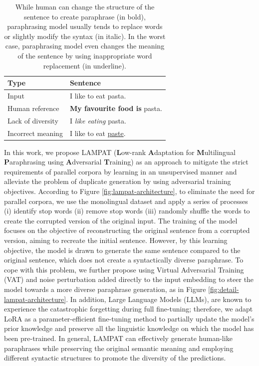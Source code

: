 \documentclass[letterpaper]{article} %
\begin{document}
\begin{table}[ht]
    \centering
    {\fontsize{9pt}{9pt}\selectfont
    \begin{tabular}{l|l}
        \textbf{Type} & \textbf{Sentence} \\ \hline
        Input &  I like to eat pasta. \\
        Human reference & \textbf{My favourite food is} pasta. \\
        Lack of diversity & I \textit{like eating} pasta. \\
        Incorrect meaning & I like to eat \underline{paste}. \\
    \end{tabular}}
    \caption{While human can change the structure of the sentence to create paraphrase (in bold), paraphrasing model usually tends to replace words or slightly modify the syntax (in italic). In the worst case, paraphrasing model even changes the meaning of the sentence by using inappropriate word replacement (in underline).}
    \label{tab:fail_example_mt}
\end{table}

In this work, we propose LAMPAT (\textbf{L}ow-rank \textbf{A}daptation for \textbf{M}ultilingual \textbf{P}araphrasing using \textbf{A}dversarial \textbf{T}raining) as an approach to mitigate the strict requirements of parallel corpora by learning in an unsupervised manner and alleviate the problem of duplicate generation by using adversarial training objectives. According to Figure \ref{fig:lampat-architecture}, to eliminate the need for parallel corpora, we use the monolingual dataset and apply a series of processes (i) identify stop words (ii) remove stop words (iii) randomly shuffle the words to create the corrupted version of the original input. The training of the model focuses on the objective of reconstructing the original sentence from a corrupted version, aiming to recreate the initial sentence. However, by this learning objective, the model is drawn to generate the same sentence compared to the original sentence, which does not create a syntactically diverse paraphrase. To cope with this problem, we further propose using Virtual Adversarial Training (VAT) \citep{NEURIPS2019_812b4ba2} and noise perturbation added directly to the input embedding to steer the model towards a more diverse paraphrase generation, as in Figure \ref{fig:detail-lampat-architecture}. In addition, Large Language Models (LLMs), are known to experience the catastrophic forgetting \citep{kaushik2021understanding} during full fine-tuning; therefore, we adapt LoRA \citep{hu2021lora} as a parameter-efficient fine-tuning method to partially update the model's prior knowledge and preserve all the linguistic knowledge on which the model has been pre-trained. In general, LAMPAT can effectively generate human-like paraphrases while preserving the original semantic meaning and employing different syntactic structures to promote the diversity of the predictions.
\end{document}
